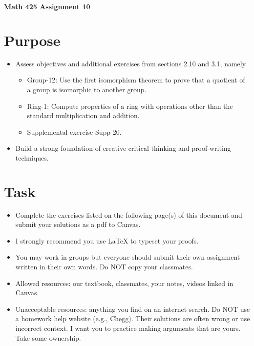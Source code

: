 \documentclass[12pt]{article}
\begin{document}
	\begin{center}
		{\Large \bf Math 425 Assignment 10}
	\end{center}
	\section*{Purpose}
	\begin{itemize}
		\item Assess objectives and additional exercises from sections 2.10 and 3.1, namely
		\begin{itemize} 
			\item Group-12: Use the first isomorphism theorem to prove that a quotient of a group is isomorphic to another group.
			\item Ring-1: Compute properties of a ring with operations other than the standard multiplication and addition.
			\item Supplemental exercise Supp-20.
		\end{itemize}
		\item Build a strong foundation of creative critical thinking and proof-writing techniques.
	\end{itemize}
	\section*{Task}
	\begin{itemize}
		\item Complete the exercises listed on the following page(s) of this document and submit your solutions as a pdf to Canvas.
		\item I strongly recommend you use LaTeX to typeset your proofs.
		\item You may work in groups but everyone should submit their own assignment written in their own words.  Do NOT copy your classmates.
		\item Allowed resources: our textbook, classmates, your notes, videos linked in Canvas.
		\item Unacceptable resources: anything you find on an internet search. Do NOT use a homework help website (e.g., Chegg). Their solutions are often wrong or use incorrect context.  I want you to practice making arguments that are yours. Take some ownership.
	\end{itemize}
\end{document}
